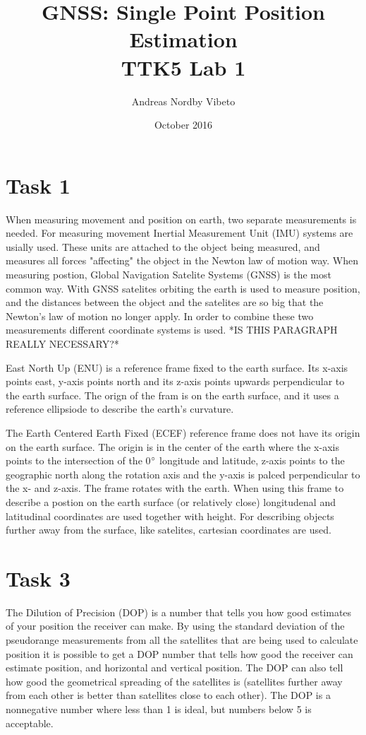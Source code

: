 \documentclass{article}
\title{GNSS: Single Point Position Estimation \\
	   \normalsize{TTK5 Lab 1}}
\author{Andreas Nordby Vibeto}
\date{October 2016}
\begin{document}
\maketitle

\section*{Task 1}

When measuring movement and position on earth, two separate measurements is needed. For measuring movement Inertial Measurement Unit (IMU) systems are usially used. These units are attached to the object being measured, and measures all forces "affecting" the object in the Newton law of motion way. When measuring postion, Global Navigation Satelite Systems (GNSS) is the most common way. With GNSS satelites orbiting the earth is used to measure position, and the distances between the object and the satelites are so big that the Newton's law of motion no longer apply. In order to combine these two measurements different coordinate systems is used. *IS THIS PARAGRAPH REALLY NECESSARY?*

East North Up (ENU) is a reference frame fixed to the earth surface. Its x-axis points east, y-axis points north and its z-axis points upwards perpendicular to the earth surface. The orign of the fram is on the earth surface, and it uses a reference ellipsiode to describe the earth's curvature.

The Earth Centered Earth Fixed (ECEF) reference frame does not have its origin on the earth surface. The origin is in the center of the earth where the x-axis points to the intersection of the 0$\degree$ longitude and latitude, z-axis points to the geographic north along the rotation axis and the y-axis is palced perpendicular to the x- and z-axis. The frame rotates with the earth. When using this frame to describe a postion on the earth surface (or relatively close) longitudenal and latitudinal coordinates are used together with height. For describing objects further away from the surface, like satelites, cartesian coordinates are used.


\section*{Task 3}
The Dilution of Precision (DOP) is a number that tells you how good estimates of your position the receiver can make. By using the standard deviation of the pseudorange measurements from all the satellites that are being used to calculate position it is possible to get a DOP number that tells how good the receiver can estimate position, and horizontal and vertical position. The DOP can also tell how good the geometrical spreading of the satellites is (satellites further away from each other is better than satellites close to each other). The DOP is a nonnegative number where less than 1 is ideal, but numbers below 5 is acceptable.
\end{document}
